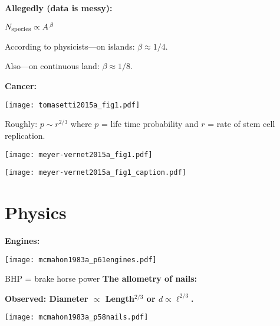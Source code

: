 \textbf{Allegedly (data is messy):\cite{macarthur1963a,levin1992a}}


$
N_{\textnormal{species}} \propto A^{\, \beta}
$

According to physicists---on islands: $\beta \approx 1/4$.

Also---on continuous land: $\beta \approx 1/8$.

\textbf{Cancer:}


\begin{marginfigure}[]
  \texttt{[image: tomasetti2015a\_fig1.pdf]}
\end{marginfigure}


Roughly:
$
p 
\sim
r^{2/3}
$
where
$p$ = life time probability 
and
$r$ = rate of stem cell replication.



\begin{marginfigure}[]
  \texttt{[image: meyer-vernet2015a\_fig1.pdf]}\\
\end{marginfigure}

\begin{marginfigure}[]
  \texttt{[image: meyer-vernet2015a\_fig1\_caption.pdf]}
\end{marginfigure}


\section{Physics}
\textbf{Engines:}

\begin{marginfigure}[]
  \texttt{[image: mcmahon1983a\_p61engines.pdf]}
\end{marginfigure}


\tiny{BHP = brake horse power}
\small
\textbf{The allometry of nails:}

\textbf{Observed: Diameter $\propto$ Length$^{2/3}$ or $d \propto \ell^{2/3}$.}
\begin{marginfigure}[]
  \texttt{[image: mcmahon1983a\_p58nails.pdf]}
\end{marginfigure}

